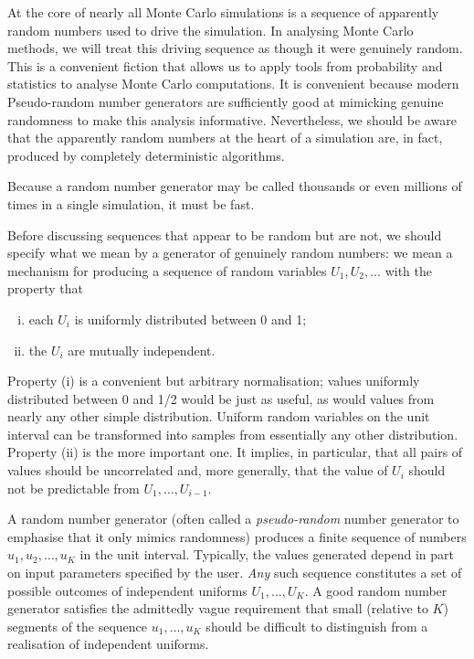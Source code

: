 At the core of nearly all Monte Carlo simulations is a sequence of apparently random numbers used to drive the simulation. In analysing Monte Carlo methods, we will treat this driving sequence as though it were genuinely random. This is a convenient fiction that allows us to apply tools from probability and statistics to analyse Monte Carlo computations. It is convenient because modern Pseudo-random number generators are sufficiently good at mimicking genuine randomness to make this analysis informative. Nevertheless, we should be aware that the apparently random numbers at the heart of a simulation are, in fact, produced by completely deterministic algorithms.

Because a random number generator may be called thousands or even millions of times in a single simulation, it must be fast.

Before discussing sequences that appear to be random but are not, we should specify what we mean by a generator of genuinely random numbers: we mean a mechanism for producing a sequence of random variables \(U_1, U_2, \dots\) with the property that
\begin{enumerate}[(i)]
	\item each \(U_i\) is uniformly distributed between 0 and 1;
	\item the \(U_i\) are mutually independent.
\end{enumerate}

Property (i) is a convenient but arbitrary normalisation; values uniformly distributed between 0 and 1/2 would be just as useful, as would values from nearly any other simple distribution. Uniform random variables on the unit interval can be transformed into samples from essentially any other distribution. Property (ii) is the more important one. It implies, in particular, that all pairs of values should be uncorrelated and, more generally, that the value of \(U_i\) should not be predictable from \(U_1, \dots, U_{i-1}\).

A random number generator (often called a \textit{pseudo-random} number generator to emphasise that it only mimics randomness) produces a finite sequence of numbers \(u_1, u_2, \dots, u_K\) in the unit interval. Typically, the values generated depend in part on input parameters specified by the user. \textit{Any} such sequence constitutes a set of possible outcomes of independent uniforms \(U_1, \dots, U_K\). A good random number generator satisfies the admittedly vague requirement that small (relative to \(K\)) segments of the sequence \(u_1, \dots, u_K\) should be difficult to distinguish from a realisation of independent uniforms.

